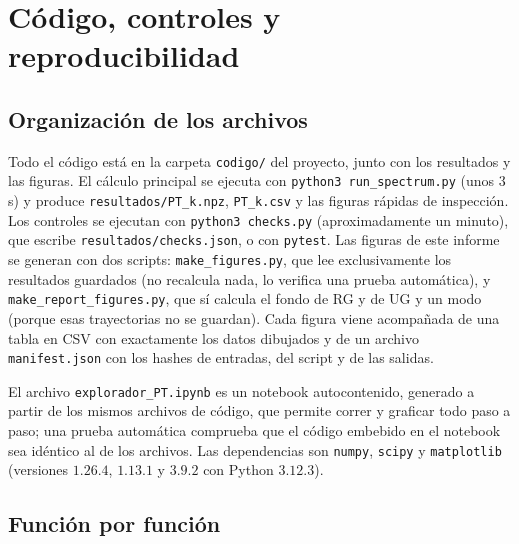 \section{Código, controles y reproducibilidad}
\label{ap:codigo}
\sloppy

\subsection{Organización de los archivos}

Todo el código está en la carpeta \texttt{codigo/} del proyecto, junto con los resultados y las figuras. El cálculo principal se ejecuta con \texttt{python3 run\_spectrum.py} (unos $3$ s) y produce \texttt{resultados/PT\_k.npz}, \texttt{PT\_k.csv} y las figuras rápidas de inspección. Los controles se ejecutan con \texttt{python3 checks.py} (aproximadamente un minuto), que escribe \texttt{resultados/checks.json}, o con \texttt{pytest}. Las figuras de este informe se generan con dos scripts: \texttt{make\_figures.py}, que lee exclusivamente los resultados guardados (no recalcula nada, lo verifica una prueba automática), y \texttt{make\_report\_figures.py}, que sí calcula el fondo de RG y de UG y un modo (porque esas trayectorias no se guardan). Cada figura viene acompañada de una tabla en CSV con exactamente los datos dibujados y de un archivo \texttt{manifest.json} con los hashes de entradas, del script y de las salidas.

El archivo \texttt{explorador\_PT.ipynb} es un notebook autocontenido, generado a partir de los mismos archivos de código, que permite correr y graficar todo paso a paso; una prueba automática comprueba que el código embebido en el notebook sea idéntico al de los archivos. Las dependencias son \texttt{numpy}, \texttt{scipy} y \texttt{matplotlib} (versiones $1.26.4$, $1.13.1$ y $3.9.2$ con Python $3.12.3$).

\subsection{Función por función}

